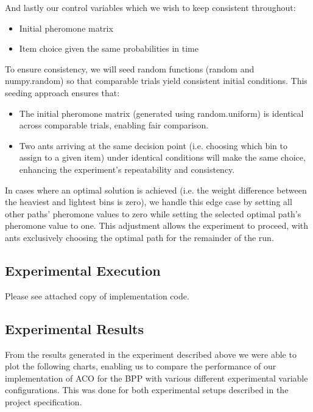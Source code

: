 \documentclass[sigconf]{acmart}
\begin{document}
            And lastly our control variables which we wish to keep consistent throughout:
            \begin{itemize}
                \item Initial pheromone matrix
                \item Item choice given the same probabilities in time\newline
            \end{itemize}

            To ensure consistency, we will seed random functions (random and numpy.random) so that comparable trials yield consistent initial conditions. This seeding approach ensures that:
            \begin{itemize}
                \item The initial pheromone matrix (generated using random.uniform) is identical across comparable trials, enabling fair comparison.
                \item Two ants arriving at the same decision point (i.e. choosing which bin to assign to a given item) under identical conditions will make the same choice, enhancing the experiment’s repeatability and consistency.\newline
            \end{itemize}

            In cases where an optimal solution is achieved (i.e. the weight difference between the heaviest and lightest bins is zero), we handle this edge case by setting all other paths' pheromone values to zero while setting the selected optimal path’s pheromone value to one. This adjustment allows the experiment to proceed, with ants exclusively choosing the optimal path for the remainder of the run.\newline

        \subsection{Experimental Execution}
            Please see attached copy of implementation code.
            
        \subsection{Experimental Results}
            From the results generated in the experiment described above we were able to plot the following charts, enabling us to compare the performance of our implementation of ACO for the BPP with various different experimental variable configurations. This was done for both experimental setups described in the project specification.\newline
\end{document}
